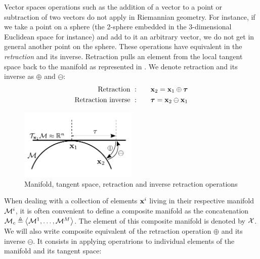 Vector spaces operations such as the addition of a vector to a point or subtraction of two vectors do not apply in Riemannian geometry. For instance, if we
take a point on a sphere (the 2-sphere embedded in the 3-dimensional Euclidean space for instance) and add to it an arbitrary vector, we do not get in general
another point on the sphere. These operations have equivalent in the \textit{retraction} and its inverse.
Retraction pulls an element from the local tangent space back to the manifold as represented in . We denote retraction and its inverse as 
$\oplus$ and $\ominus$:
%
\begin{align}
            \text{Retraction}~:&\quad\quad {\bf x}_2 = {\bf x}_1 \oplus {\bm \tau}   \\
    \text{Retraction inverse}~:&\quad\quad {\bm \tau} = {\bf x}_2 \ominus {\bf x}_1  \\
\end{align}


\begin{figure}[h]
    \centering
    \includegraphics[width=0.5\textwidth]{figures/manifold.pdf}
    \caption{Manifold, tangent space, retraction and inverse retraction operations}
    \label{fig:manifold}
\end{figure}

When dealing with a collection of elements ${\bf x}^i$ living in their respective manifold $\mathcal{M}^i$, it is often convenient to define a composite manifold
as the concatenation $\mathcal{M}_c \triangleq \left<\mathcal{M}^1, \dots, \mathcal{M}^M \right>$. The element of this composite manifold is denoted by $\mathcal{X}$.
We will also write composite equivalent of the retraction operation $\oplus$ and 
its inverse $\ominus$. It consists in applying operatrions to individual elements of the manifold and its tangent space:

